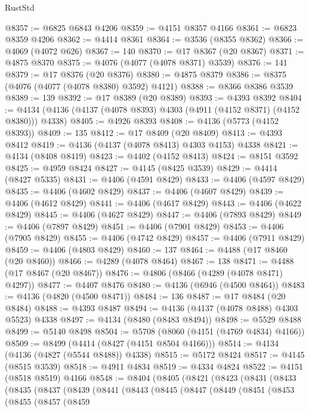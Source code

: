 \begin{lexlean}{RustStd}
\begin{coremodule}
{\begin{coremodule}
{{{{{{{{{{{{{{{{{{{{{{{{{{{{{{{{{{{{{{{{{{{{{{{{{{@8357 := @6825 @6843 @4206
@8359 := @4151 @8357 @4166
@8361 := @6823 @8359 @4206
@8362 := @4414 @8361
@8364 := @3536 (@8355 @8362)
@8366 := @4069 (@4072 @626)
@8367 := 140
@8370 := @17 @8367 (@20 @8367)
@8371 := @4875 @8370
@8375 := @4076 (@4077 (@4078 @8371) @3539)
@8376 := 141
@8379 := @17 @8376 (@20 @8376)
@8380 := @4875 @8379
@8386 := @8375 (@4076 (@4077 (@4078 @8380) @3592) @4121)
@8388 := @8366 @8386 @3539
@8389 := 139
@8392 := @17 @8389 (@20 @8389)
@8393 := @4393 @8392
@8404 := @4134 (@4136 (@4137 (@4078 @8393) @4303 (@4911 (@4152 @8371) (@4152 @8380))) @4338)
@8405 := @4926 @8393
@8408 := @4136 (@5773 (@4152 @8393))
@8409 := 135
@8412 := @17 @8409 (@20 @8409)
@8413 := @4393 @8412
@8419 := @4136 (@4137 (@4078 @8413) @4303 @4153) @4338
@8421 := @4134 (@8408 @8419)
@8423 := @4402 (@4152 @8413)
@8424 := @8151 @3592
@8425 := @4959 @8424
@8427 := @4145 (@8425 @3539)
@8429 := @4414 (@8427 @5335)
@8431 := @4406 (@4591 @8429)
@8433 := @4406 (@4597 @8429)
@8435 := @4406 (@4602 @8429)
@8437 := @4406 (@4607 @8429)
@8439 := @4406 (@4612 @8429)
@8441 := @4406 (@4617 @8429)
@8443 := @4406 (@4622 @8429)
@8445 := @4406 (@4627 @8429)
@8447 := @4406 (@7893 @8429)
@8449 := @4406 (@7897 @8429)
@8451 := @4406 (@7901 @8429)
@8453 := @4406 (@7905 @8429)
@8455 := @4406 (@4742 @8429)
@8457 := @4406 (@7911 @8429)
@8459 := @4406 (@4803 @8429)
@8460 := 137
@8464 := @4488 (@17 @8460 (@20 @8460))
@8466 := @4289 (@4078 @8464)
@8467 := 138
@8471 := @4488 (@17 @8467 (@20 @8467))
@8476 := @4806 (@8466 (@4289 (@4078 @8471) @4297))
@8477 := @4407 @8476
@8480 := @4136 (@6946 (@4500 @8464))
@8483 := @4136 (@4820 (@4500 @8471))
@8484 := 136
@8487 := @17 @8484 (@20 @8484)
@8488 := @4393 @8487
@8494 := @4136 (@4137 (@4078 @8488) @4303 @5523) @4338
@8497 := @4134 (@8480 (@8483 @8494))
@8498 := @5529 @8488
@8499 := @5140 @8498
@8504 := @5708 (@8060 (@4151 (@4769 @4834) @4166))
@8509 := @8499 (@4414 (@8427 (@4151 @8504 @4166)))
@8514 := @4134 (@4136 (@4827 (@5544 @8488)) @4338)
@8515 := @5172 @8424
@8517 := @4145 (@8515 @3539)
@8518 := @4911 @4834
@8519 := @4334 @4824
@8522 := @4151 (@8518 @8519) @4166
@8548 := @8404
    (@8405
      (@8421
        (@8423
          (@8431
            (@8433
              (@8435
                (@8437
                  (@8439
                    (@8441
                      (@8443
                        (@8445
                          (@8447
                            (@8449
                              (@8451
                                (@8453
                                  (@8455
                                    (@8457
                                      (@8459
}}}}}}}}}}}}}}}}}}}}}}}}}}}}}}}}}}}}}}}}}}}}}}}}}}
\end{coremodule}}
\end{coremodule}
\end{lexlean}
